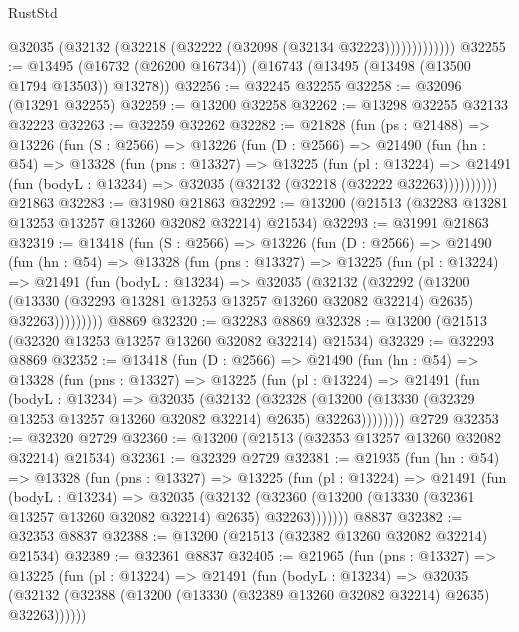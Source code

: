 \begin{lexlean}{RustStd}
\begin{coremodule}
                  @32035 (@32132 (@32218 (@32222 (@32098 (@32134 @32223)))))))))))))
@32255 := @13495 (@16732 (@26200 @16734)) (@16743 (@13495 (@13498 (@13500 @1794 @13503)) @13278))
@32256 := @32245 @32255
@32258 := @32096 (@13291 @32255)
@32259 := @13200 @32258
@32262 := @13298 @32255 @32133 @32223
@32263 := @32259 @32262
@32282 := @21828
    (fun (ps : @21488) =>
    @13226
      (fun (S : @2566) =>
      @13226
        (fun (D : @2566) =>
        @21490
          (fun (hn : @54) =>
          @13328
            (fun (pns : @13327) =>
            @13225
              (fun (pl : @13224) =>
              @21491 (fun (bodyL : @13234) => @32035 (@32132 (@32218 (@32222 @32263))))))))))
    @21863
@32283 := @31980 @21863
@32292 := @13200 (@21513 (@32283 @13281 @13253 @13257 @13260 @32082 @32214) @21534)
@32293 := @31991 @21863
@32319 := @13418
    (fun (S : @2566) =>
    @13226
      (fun (D : @2566) =>
      @21490
        (fun (hn : @54) =>
        @13328
          (fun (pns : @13327) =>
          @13225
            (fun (pl : @13224) =>
            @21491
              (fun (bodyL : @13234) =>
              @32035
                (@32132
                  (@32292
                    (@13200
                      (@13330 (@32293 @13281 @13253 @13257 @13260 @32082 @32214) @2635)
                      @32263)))))))))
    @8869
@32320 := @32283 @8869
@32328 := @13200 (@21513 (@32320 @13253 @13257 @13260 @32082 @32214) @21534)
@32329 := @32293 @8869
@32352 := @13418
    (fun (D : @2566) =>
    @21490
      (fun (hn : @54) =>
      @13328
        (fun (pns : @13327) =>
        @13225
          (fun (pl : @13224) =>
          @21491
            (fun (bodyL : @13234) =>
            @32035
              (@32132
                (@32328
                  (@13200 (@13330 (@32329 @13253 @13257 @13260 @32082 @32214) @2635) @32263))))))))
    @2729
@32353 := @32320 @2729
@32360 := @13200 (@21513 (@32353 @13257 @13260 @32082 @32214) @21534)
@32361 := @32329 @2729
@32381 := @21935
    (fun (hn : @54) =>
    @13328
      (fun (pns : @13327) =>
      @13225
        (fun (pl : @13224) =>
        @21491
          (fun (bodyL : @13234) =>
          @32035
            (@32132
              (@32360 (@13200 (@13330 (@32361 @13257 @13260 @32082 @32214) @2635) @32263)))))))
    @8837
@32382 := @32353 @8837
@32388 := @13200 (@21513 (@32382 @13260 @32082 @32214) @21534)
@32389 := @32361 @8837
@32405 := @21965
    (fun (pns : @13327) =>
    @13225
      (fun (pl : @13224) =>
      @21491
        (fun (bodyL : @13234) =>
        @32035 (@32132 (@32388 (@13200 (@13330 (@32389 @13260 @32082 @32214) @2635) @32263))))))

\end{coremodule}
\end{lexlean}
